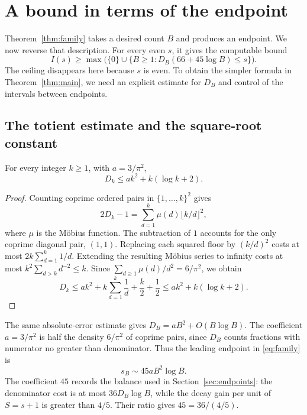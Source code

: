 \section{A bound in terms of the endpoint}\label{sec:count}

Theorem~\ref{thm:family} takes a desired count $B$ and produces
an endpoint. We now reverse that description. For every even $s$,
it gives the computable bound
\begin{equation}\label{eq:inverse}
 I(s)\ge\max\bigl(\{0\}\cup
       \{B\ge1:D_B(66+45\log B)\le s\}\bigr).
\end{equation}
The ceiling disappears here because $s$ is even. To obtain the
simpler formula in Theorem~\ref{thm:main}, we need an explicit
estimate for $D_B$ and control of the intervals between endpoints.

\subsection{The totient estimate and the square-root constant}

\begin{lemma}\label{lem:totients}
For every integer $k\ge1$, with $a=3/\pi^2$,
\begin{equation}\label{eq:totient-bound}
 D_k\le ak^2+k(\log k+2).
\end{equation}
\end{lemma}
\begin{proof}
Counting coprime ordered pairs in $\{1,\ldots,k\}^2$ gives
\[
 2D_k-1=\sum_{d=1}^k\mu(d)\lfloor k/d\rfloor^2,
\]
where $\mu$ is the M\"obius function. The subtraction of $1$
accounts for the only coprime diagonal pair, $(1,1)$. Replacing
each squared floor by $(k/d)^2$ costs at most
$2k\sum_{d=1}^k1/d$. Extending the resulting M\"obius series
to infinity costs at most $k^2\sum_{d>k}d^{-2}\le k$.
Since $\sum_{d\ge1}\mu(d)/d^2=6/\pi^2$, we obtain
\[
 D_k\le ak^2+k\sum_{d=1}^k\frac1d+\frac k2+\frac12
       \le ak^2+k(\log k+2).
\]
\end{proof}

The same absolute-error estimate gives
$D_B=aB^2+O(B\log B)$.
The coefficient $a=3/\pi^2$ is half the density $6/\pi^2$ of
coprime pairs, since $D_B$ counts fractions with numerator no
greater than denominator. Thus the leading endpoint in
\eqref{eq:family} is
\[
 s_B\sim45aB^2\log B.
\]
The coefficient $45$ records the balance used in
Section~\ref{sec:endpoints}: the denominator cost is at most
$36D_B\log B$, while the decay gain per unit of $S=s+1$ is greater
than $4/5$. Their ratio gives $45=36/(4/5)$.

